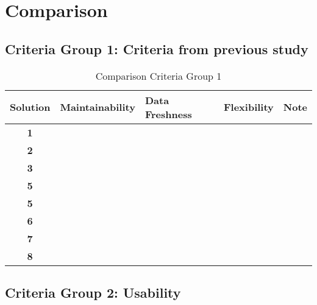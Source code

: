 \section{Comparison}\label{comparison}
\subsection{Criteria Group 1: Criteria from previous study}

\begin{table}[htbp]
\centering
\begin{tabular}{|c|l|l|l|l|}
\hline
\textbf{Solution}   & \textbf{Maintainability} & \textbf{Data Freshness} & \textbf{Flexibility} & \textbf{Note} \\ \hline
\textbf{1} &                          &                         &                      &               \\ \hline
\textbf{2} &                          &                         &                      &               \\ \hline
\textbf{3} &                          &                         &                      &               \\ \hline
\textbf{5} &                          &                         &                      &               \\ \hline
\textbf{5} &                          &                         &                      &               \\ \hline
\textbf{6} &                          &                         &                      &               \\ \hline
\textbf{7} &                          &                         &                      &               \\ \hline
\textbf{8} &                          &                         &                      &               \\ \hline
\end{tabular}
\caption{Comparison Criteria Group 1}
\label{tbl_comp_gr_1}
\end{table}

\subsection{Criteria Group 2: Usability}

